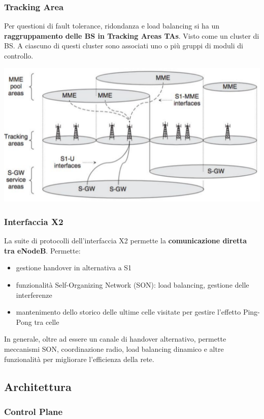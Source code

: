 \subsubsection{Tracking Area}

Per questioni di fault tolerance, ridondanza e load balancing si ha un \textbf{raggruppamento delle BS in Tracking Areas TAs}. Visto come un cluster di BS. A ciascuno di questi cluster sono associati uno o più gruppi di moduli di controllo.
\begin{center}
	\includegraphics[width=0.7\linewidth]{img/4g/tas}
\end{center}

\subsubsection{Interfaccia X2}

La suite di protocolli dell'interfaccia X2 permette la \textbf{comunicazione diretta tra eNodeB}. Permette: 
\begin{itemize}
	\item gestione handover in alternativa a S1
	\item funzionalità Self-Organizing Network (SON): load balancing, gestione delle interferenze
	\item mantenimento dello storico delle ultime celle visitate per gestire l'effetto Ping-Pong tra celle
\end{itemize}

In generale, oltre ad essere un canale di handover alternativo, permette meccanismi SON, coordinazione radio, load balancing dinamico e altre funzionalità per migliorare l'efficienza della rete.\\

\newpage

\subsection{Architettura}

\subsubsection{Control Plane}

